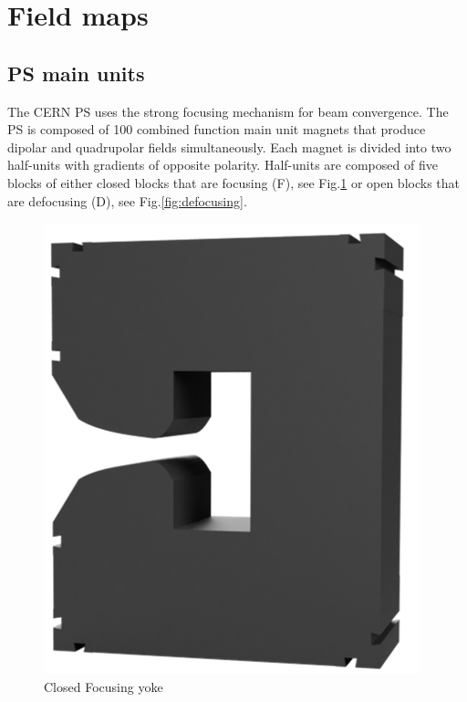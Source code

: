 \documentclass[a4paper,
               biblatex,     %
               keeplastbox,   %
               ]{jacow}
\begin{document}
\section{Field maps}
\subsection{PS main units}
The CERN PS uses the strong focusing mechanism for beam convergence. The PS is composed of 100 combined function main unit magnets that produce dipolar and quadrupolar fields simultaneously. Each magnet is divided into two half-units with gradients of opposite polarity. Half-units are composed of five blocks of either closed blocks that are focusing (F), see Fig.\ref{fig:focusing} or open blocks that are defocusing (D), see Fig.\ref{fig:defocusing}.

\begin{figure}[!htb]
  \centering
  \begin{minipage}[b]{0.45\columnwidth}
    \includegraphics*[width=\textwidth]{focusing}
    \caption{Closed Focusing yoke}
    \label{fig:focusing}
  \end{minipage}

\end{figure}
\end{document}
